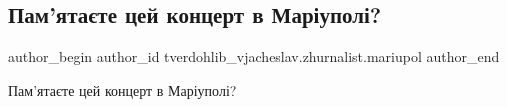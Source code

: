  
 
 
 
 

\subsection{Пам'ятаєте цей концерт в Маріуполі?}
\label{sec:01_02_2023.fb.tverdohlib_vjacheslav.zhurnalist.mariupol.1.pam_yata_te_tsei_kon}

\ifcmt
 author_begin
   author_id tverdohlib_vjacheslav.zhurnalist.mariupol
 author_end
\fi

Пам'ятаєте цей концерт в Маріуполі?
